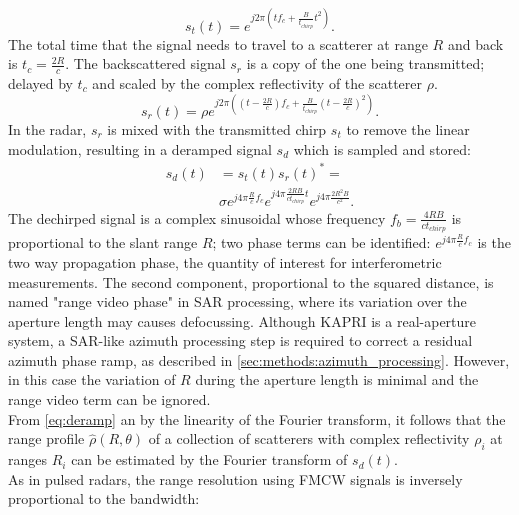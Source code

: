\begin{equation}
	s_t\left(t\right) = e^{j 2 \pi \left( t f_{c} +  \frac{B}{t_{chirp}} t^2 \right)}.
\end{equation}
The total time that the signal needs to travel to a scatterer at range $R$ and back is $t_{c} = \frac{2 R}{c}$. The backscattered signal $s_r$ is a copy of the one being transmitted; delayed by $t_{c}$ and scaled by the complex reflectivity of the scatterer $\rho$.
\begin{equation}
		s_r\left(t\right) = \rho e^{j 2 \pi \left( \left(t - \frac{2 R}{c}\right) f_{c} +  \frac{B}{t_{chirp}} \left(t - \frac{2 R}{c}\right)^2 \right)}.
\end{equation}
In the radar, $s_r$ is mixed with the transmitted chirp $s_t$  to remove the linear modulation, resulting in a deramped signal $s_d$ which is sampled and stored: 
\begin{equation}\label{eq:deramp}
	\begin{aligned}
	s_{d}\left(t\right) &=s_t\left(t\right)s_r\left(t\right)^* =\\ 
	&\sigma e^{j 4 \pi \frac{ R}{c}f_c}  e^{j 4 \pi \frac{2 R B }{c t_{chirp}} t}  e^{j 4 \pi \frac{2 R^2 B}{c^2}}.
	\end{aligned}
\end{equation} 
The dechirped signal is a complex sinusoidal whose frequency $f_{b} = \frac{4 R B}{c t_{chirp}}$ is proportional to the slant range $R$;
two phase terms can be identified: $ e^{j 4 \pi \frac{R}{c}f_c}$ is the two way propagation phase, the quantity of interest for  interferometric measurements. The second component, proportional to the squared distance, is named "range video phase" in SAR processing, where its variation over the aperture length may causes defocussing. Although KAPRI is a real-aperture system, a SAR-like azimuth processing step is required to correct a residual azimuth phase ramp, as described in \autoref{sec:methods:azimuth_processing}. However, in this case the variation of $R$ during the aperture length is minimal and the range video term can be ignored.\\
From \autoref{eq:deramp} an by the linearity of the Fourier transform, it follows that the range profile $\hat{\rho}\left(R, \theta\right)$ of a collection of scatterers with complex reflectivity $\rho_i$ at ranges $R_{i}$ can be estimated by the Fourier transform of $s_{d}\left(t\right)$.\\
As in pulsed radars, the range resolution using FMCW signals is inversely proportional to the bandwidth:

